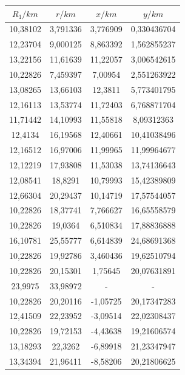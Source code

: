\documentclass[12pt]{article}
\begin{document}
\begin{minipage}{.5\textwidth}
    \vspace*{-2.1cm}\hspace*{0.2cm}\small{\begin{tabular}{|c|c|c|c}
        $R_1 / km$ & $r / km$ & $x /km$ & $y / km$ \\ \hline         
            10,38102 & 3,791336 & 3,776909 & 0,330436704 \\ 
            12,23704 & 9,000125 & 8,863392 & 1,562855237 \\ 
            13,22156 & 11,61639 & 11,22057 & 3,006542615 \\ 
            10,22826 & 7,459397 & 7,00954 & 2,551263922 \\ 
            13,08265 & 13,66103 & 12,3811 & 5,773401795 \\ 
            12,16113 & 13,53774 & 11,72403 & 6,768871704 \\ 
            11,71442 & 14,10993 & 11,55818 & 8,09312363 \\ 
            12,4134 & 16,19568 & 12,40661 & 10,41038496 \\ 
            12,16512 & 16,97006 & 11,99965 & 11,99964677 \\ 
            12,12219 & 17,93808 & 11,53038 & 13,74136643 \\ 
            12,08541 & 18,8291 & 10,79993 & 15,42389809 \\ 
            12,66304 & 20,29437 & 10,14719 & 17,57544057 \\ 
            10,22826 & 18,37741 & 7,766627 & 16,65558579 \\ 
            10,22826 & 19,0364 & 6,510834 & 17,88836888 \\ 
            16,10781 & 25,55777 & 6,614839 & 24,68691368 \\ 
            10,22826 & 19,92786 & 3,460436 & 19,62510794 \\ 
            10,22826 & 20,15301 & 1,75645 & 20,07631891 \\ 
            23,9975 & 33,98972 & - & - \\ 
            10,22826 & 20,20116 & -1,05725 & 20,17347283 \\ 
            12,41509 & 22,23952 & -3,09514 & 22,02308437 \\ 
            10,22826 & 19,72153 & -4,43638 & 19,21606574 \\ 
            13,18293 & 22,3262 & -6,89918 & 21,23347947 \\ 
            13,34394 & 21,96411 & -8,58206 & 20,21806625 \\ 

\end{tabular}}
\end{minipage}
\end{document}

